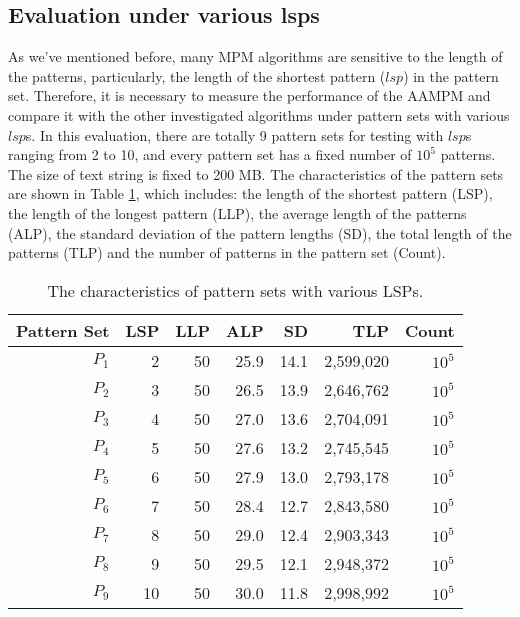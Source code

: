 \documentclass{article}
\begin{document}
\subsection{Evaluation under various lsps}

As we've mentioned before, many MPM algorithms are sensitive to the
length of the patterns, particularly, the length of the shortest
pattern ($lsp$) in the pattern set. Therefore, it is necessary to
measure the performance of the \textsf{AAMPM} and compare it with the
other investigated algorithms under pattern sets with various
$lsp$s. In this evaluation, there are totally 9 pattern sets for
testing with $lsp$s ranging from 2 to 10, and every pattern set has a
fixed number of $10^5$ patterns. The size of text string is fixed to
200 MB. The characteristics of the pattern sets are shown in Table
\ref{tab:lsps}, which includes: the length of the shortest pattern
(LSP), the length of the longest pattern (LLP), the average length of
the patterns (ALP), the standard deviation of the pattern lengths
(SD), the total length of the patterns (TLP) and the number of
patterns in the pattern set (Count).

\begin{table}
  \centering
  \caption{The characteristics of pattern sets with various LSPs.}
  \scriptsize
  \label{tab:lsps}
  \begin{tabular}{rrrrrrr}
    \hline
    Pattern Set & LSP  & LLP  & ALP & SD & TLP & Count\\
    \hline
    $P_1$ & 2 & 50 & 25.9 & 14.1 & 2,599,020 & $10^5$\\
    $P_2$ & 3 & 50 & 26.5 & 13.9 & 2,646,762 & $10^5$\\
    $P_3$ & 4 & 50 & 27.0 & 13.6 & 2,704,091 & $10^5$\\
    $P_4$ & 5 & 50 & 27.6 & 13.2 & 2,745,545 & $10^5$\\
    $P_5$ & 6 & 50 & 27.9 & 13.0 & 2,793,178 & $10^5$\\
    $P_6$ & 7 & 50 & 28.4 & 12.7 & 2,843,580 & $10^5$\\
    $P_7$ & 8 & 50 & 29.0 & 12.4 & 2,903,343 & $10^5$\\
    $P_8$ & 9 & 50 & 29.5 & 12.1 & 2,948,372 & $10^5$\\
    $P_9$ &10 & 50 & 30.0 & 11.8 & 2,998,992 & $10^5$\\
    \hline
  \end{tabular}
\end{table}

\end{document}
